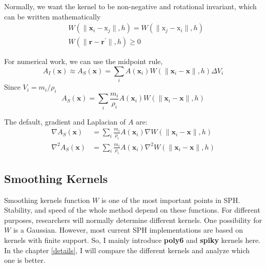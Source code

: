     Normally, we want the kernel to be non-negative and rotational invariant, which can be written mathematically
    \begin{subequations}
        \begin{align}
            & W(\|\textbf{x}_{i} - \text{x}_{j}\|, h) = W(\|\text{x}_{j} - \text{x}_{i}\|, h) \\
            & W(\|\textbf{r} - \textbf{r}^{\prime}\|, h) \ge 0
        \end{align}
    \end{subequations}

    For numerical work, we can use the midpoint rule,
    \begin{equation}
        A_{I}(\textbf{x}) \approx A_{S}(\textbf{x}) = \sum_{i} A(\textbf{x}_{i})W(\|\textbf{x}_{i}-\textbf{x}\|, h)\Delta V_{i}
    \end{equation}
    Since $V_{i} = m_{i}/\rho _{i}$
    \begin{equation}
        A_{S}(\textbf{x}) = \sum_{i} \frac{m_{i}}{\rho_{i}} A(\textbf{x}_{i})W(\|\textbf{x}_{i}-\textbf{x}\|, h)
    \end{equation}

    The default, gradient and Laplacian of $A$ are:
    \begin{subequations}
        \begin{align}
            \nabla A_{S}(\textbf{x}) &= \sum_{i} \frac{m_{i}}{\rho_{i}} A(\textbf{x}_{i})\nabla W(\|\textbf{x}_{i}-\textbf{x}\|, h) \\
            \nabla^{2} A_{S}(\textbf{x}) &= \sum_{i} \frac{m_{i}}{\rho_{i}} A(\textbf{x}_{i})\nabla^{2} W(\|\textbf{x}_{i}-\textbf{x}\|, h)
        \end{align}
        \label{eq:1}
    \end{subequations}

    \subsection{Smoothing Kernels}
    \label{sec:kernels}
    Smoothing kernels function $W$ is one of the most important points in SPH. Stability, and speed of the whole method depend on these functions. For different purposes, researchers will normally determine different kernels. One possibility for $W$ is a Gaussian. However, most current SPH implementations are based on kernels with finite support. So, I mainly introduce \textbf{poly6} and \textbf{spiky} kernels here. In the chapter \ref{details}, I will compare the different kernels and analyze which one is better.

